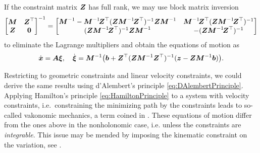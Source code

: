 If the constraint matrix $\boldsymbol{Z}$ has full rank, we may use block matrix inversion
\begin{align}
 \begin{bmatrix} \boldsymbol{M} & \boldsymbol{Z}^\top \\ \boldsymbol{Z} & \boldsymbol{0} \end{bmatrix}^{-1}
 =
 \begin{bmatrix} \boldsymbol{M}^{-1} - \boldsymbol{M}^{-1}\! \boldsymbol{Z}^\top (\boldsymbol{Z} \boldsymbol{M}^{-1}\! \boldsymbol{Z}^\top)^{-1} \boldsymbol{Z} \boldsymbol{M}^{-1} & \boldsymbol{M}^{-1}\! \boldsymbol{Z}^\top (\boldsymbol{Z} \boldsymbol{M}^{-1}\! \boldsymbol{Z}^\top)^{-1} \\ (\boldsymbol{Z} \boldsymbol{M}^{-1}\! \boldsymbol{Z}^\top)^{-1} \boldsymbol{Z} \boldsymbol{M}^{-1} & -(\boldsymbol{Z} \boldsymbol{M}^{-1}\! \boldsymbol{Z}^\top)^{-1} \end{bmatrix}
\end{align}
to eliminate the Lagrange multipliers and obtain the equations of motion as
\begin{align}
 \dot{\boldsymbol{x}} = \boldsymbol{A}\boldsymbol{\xi}, 
\quad
 \dot{\boldsymbol{\xi}} = \boldsymbol{M}^{-1} \big( \boldsymbol{b} + \boldsymbol{Z}^\top (\boldsymbol{Z} \boldsymbol{M}^{-1} \boldsymbol{Z}^\top)^{-1} (\boldsymbol{z} - \boldsymbol{Z} \boldsymbol{M}^{-1}\boldsymbol{b}) \big)
 .
\end{align}

Restricting to geometric constraints and linear velocity constraints, we could derive the same results using d'Alembert's principle \eqref{eq:DAlembertPrinciple}.
Applying Hamilton's principle \eqref{eq:HamiltonPrinciple} to a system with velocity constraints, i.e.\ constraining the minimizing path by the constraints leads to so-called vakonomic mechanics, a term coined in \cite{Kozlov:vakonomic}.
These equations of motion differ from the ones above in the nonholonomic case, i.e. unless the constraints are \textit{integrable}.
This issue may be mended by imposing the kinematic constraint on the variation, see \cite[pp.\ 208--213]{Bloch:NonholonomicMechanics}.

